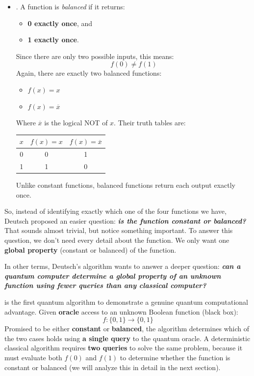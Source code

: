 \begin{itemize}
    \item {}. A function is \emph{balanced} if it returns:
    \begin{itemize}
        \item \textbf{0 exactly once}, and
        \item \textbf{1 exactly once}.
    \end{itemize}
    Since there are only two possible inputs, this means:
    \begin{equation*}
        f(0) \neq f(1)
    \end{equation*}
    Again, there are exactly two balanced functions:
    \begin{itemize}
        \item $f(x) = x$
        \item $f(x) = \overline{x}$
    \end{itemize}
    Where $\overline{x}$ is the logical NOT of $x$. Their truth tables are:
    \begin{center}
        \begin{tabular}{@{} c c c @{}}
            \toprule
            $x$ & $f(x)=x$ & $f(x)=\overline{x}$ \\
            \midrule
            0 & 0 & 1 \\
            1 & 1 & 0 \\
            \bottomrule
        \end{tabular}
    \end{center}
    Unlike constant functions, balanced functions return each output exactly once.
\end{itemize}
So, instead of identifying exactly which one of the four functions we have, Deutsch proposed an easier question: \emph{\textbf{is the function constant or balanced?}} That sounds almost trivial, but notice something important. To answer this question, we don't need every detail about the function. We only want one \textbf{global property} (constant or balanced) of the function.

\highspace
In other terms, Deutsch's algorithm wants to answer a deeper question: \emph{\textbf{can a quantum computer determine a global property of an unknown function using fewer queries than any classical computer?}}

\highspace
\begin{definitionbox}
     is the first quantum algorithm to demonstrate a genuine quantum computational advantage. Given \textbf{oracle} access to an unknown Boolean function (black box):
    \begin{equation*}
        f : \{0, 1\} \to \{0, 1\}
    \end{equation*}
    Promised to be either \textbf{constant} or \textbf{balanced}, the algorithm determines which of the two cases holds using \textbf{a single query} to the quantum oracle. A deterministic classical algorithm requires \textbf{two queries} to solve the same problem, because it must evaluate both $f(0)$ and $f(1)$ to determine whether the function is constant or balanced (we will analyze this in detail in the next section).
\end{definitionbox}

